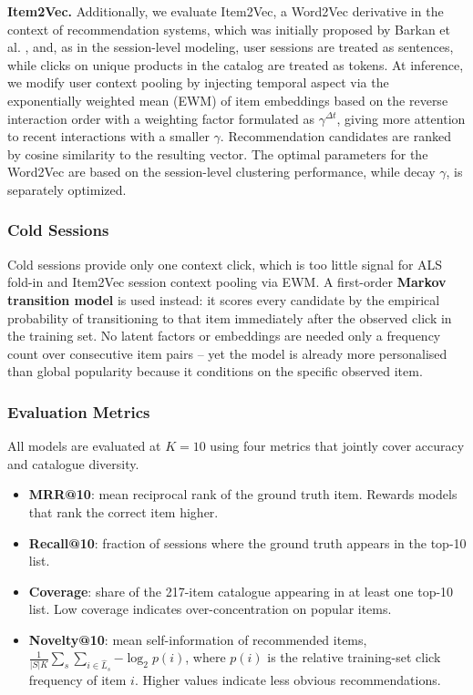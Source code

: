 \documentclass[a4paper,oneside,12pt]{book}
\begin{document}
\textbf{Item2Vec.}
Additionally, we evaluate Item2Vec, a Word2Vec derivative in the context of recommendation systems, which was initially proposed by Barkan et al. \cite{barkan2016item2vec}, and, as in the session-level modeling, user sessions are treated as sentences, while clicks on unique products in the catalog are treated as tokens. At inference, we modify user context pooling by injecting temporal aspect via the exponentially weighted mean (EWM) of item embeddings based on the reverse interaction order with a weighting factor formulated as $\gamma^{\Delta t}$, giving more attention to recent interactions with a smaller $\gamma$. Recommendation candidates are ranked by cosine similarity to the resulting vector. The optimal parameters for the Word2Vec are based on the session-level clustering performance, while decay $\gamma$, is separately optimized.

\subsubsection{Cold Sessions}

Cold sessions provide only one context click, which is too little signal
for ALS fold-in and Item2Vec session context pooling via EWM.
A first-order \textbf{Markov transition model} is used instead: it scores
every candidate by the empirical probability of transitioning to that item
immediately after the observed click in the training set.
No latent factors or embeddings are needed only a frequency count over
consecutive item pairs -- yet the model is already more personalised than
global popularity because it conditions on the specific observed item.

\subsubsection{Evaluation Metrics}

All models are evaluated at $K = 10$ using four metrics that jointly cover
accuracy and catalogue diversity.

\begin{itemize}
    \item \textbf{MRR@10}: mean reciprocal rank of the ground truth item.
          Rewards models that rank the correct item higher.

    \item \textbf{Recall@10}: fraction of sessions where the ground truth
          appears in the top-10 list.

    \item \textbf{Coverage}: share of the 217-item catalogue appearing in
          at least one top-10 list. Low coverage indicates over-concentration
          on popular items.

    \item \textbf{Novelty@10}: mean self-information of recommended items,
          $\frac{1}{|S|K}\sum_{s}\sum_{i \in \hat{L}_s} {-\log_2 p(i)}$,
          where $p(i)$ is the relative training-set click frequency of item
          $i$. Higher values indicate less obvious recommendations.
\end{itemize}
\end{document}
